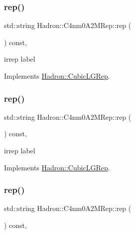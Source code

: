 \subsubsection{\texorpdfstring{rep()}{rep()}\hspace{0.1cm}{\footnotesize\ttfamily [1/3]}}
{\footnotesize\ttfamily std\+::string Hadron\+::\+C4nm0\+A2\+M\+Rep\+::rep (\begin{DoxyParamCaption}{ }\end{DoxyParamCaption}) const\hspace{0.3cm}{\ttfamily [inline]}, {\ttfamily [virtual]}}

irrep label 

Implements \mbox{\hyperlink{structHadron_1_1CubicLGRep_a50f5ddbb8f4be4cee0106fa9e8c75e6c}{Hadron\+::\+Cubic\+L\+G\+Rep}}.

\mbox{\label{structHadron_1_1C4nm0A2MRep_a32eaa35da406679229721f90a391ff76}} 
\subsubsection{\texorpdfstring{rep()}{rep()}\hspace{0.1cm}{\footnotesize\ttfamily [2/3]}}
{\footnotesize\ttfamily std\+::string Hadron\+::\+C4nm0\+A2\+M\+Rep\+::rep (\begin{DoxyParamCaption}{ }\end{DoxyParamCaption}) const\hspace{0.3cm}{\ttfamily [inline]}, {\ttfamily [virtual]}}

irrep label 

Implements \mbox{\hyperlink{structHadron_1_1CubicLGRep_a50f5ddbb8f4be4cee0106fa9e8c75e6c}{Hadron\+::\+Cubic\+L\+G\+Rep}}.

\mbox{\label{structHadron_1_1C4nm0A2MRep_a32eaa35da406679229721f90a391ff76}} 
\subsubsection{\texorpdfstring{rep()}{rep()}\hspace{0.1cm}{\footnotesize\ttfamily [3/3]}}
{\footnotesize\ttfamily std\+::string Hadron\+::\+C4nm0\+A2\+M\+Rep\+::rep (\begin{DoxyParamCaption}{ }\end{DoxyParamCaption}) const\hspace{0.3cm}{\ttfamily [inline]}, {\ttfamily [virtual]}}

